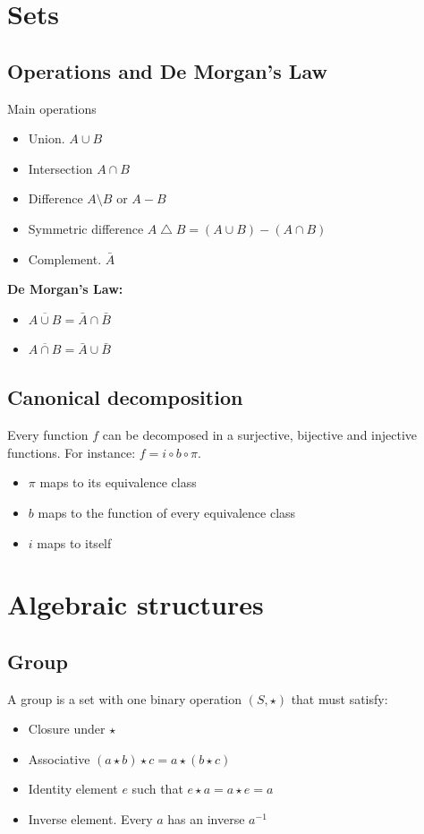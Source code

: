 \documentclass[12pt]{article}
\begin{document}
\section{Sets}
    \subsection{Operations and De Morgan's Law}
    Main operations
    \begin{itemize}
    	\item Union. $A \cup B$
    	\item Intersection $A \cap B$
    	\item Difference $A \setminus B$ or $A-B$
    	\item Symmetric difference $A \bigtriangleup B = (A\cup B)-(A\cap B)$
    	\item Complement. $\bar{A}$	
    \end{itemize}
    \textbf{De Morgan's Law:}
    \begin{itemize}
    	\item $\overline{A \cup B}=\bar{A}\cap \bar{B}$
    	\item $\overline{A\cap B}=\bar{A}\cup \bar{B}$
    \end{itemize}

	\subsection{Canonical decomposition}
	Every function $f$ can be decomposed in a surjective, bijective and injective functions. 		For instance: $f=i \circ b \circ \pi$.
	\begin{itemize}
		\item $\pi$ maps to its equivalence class
		\item $b$ maps to the function of every equivalence class
		\item $i$ maps to itself
    \end{itemize}
    \section{Algebraic structures}
	\subsection{Group}
	A group is a set with one binary operation $(S,\star)$ that must satisfy:
	\begin{itemize}
		\item Closure under $\star$
		\item Associative $(a\star b)\star c=a\star (b\star c)$
		\item Identity element $e$ such that $e\star a=a\star e=a$
		\item Inverse element. Every $a$ has an inverse $a^{-1}$
	\end{itemize}
	
\end{document}
